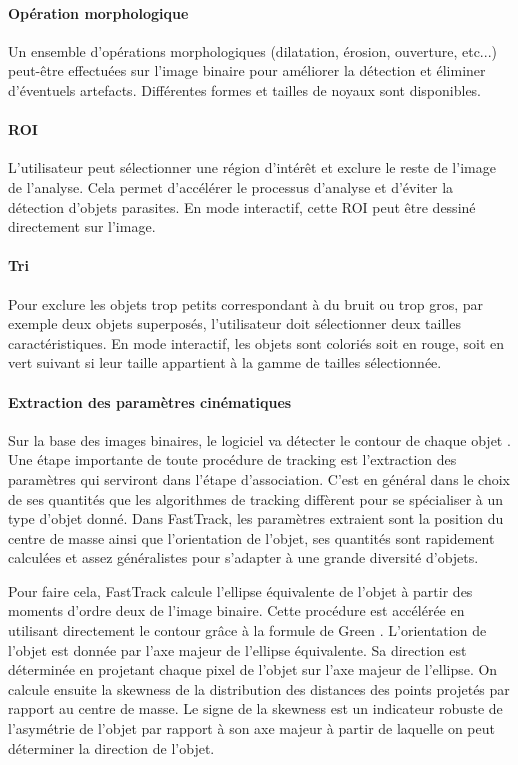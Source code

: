 		
		\paragraph{Opération morphologique}
		Un ensemble d'opérations morphologiques (dilatation, érosion, ouverture, etc...) peut-être effectuées sur l'image binaire pour améliorer la détection et éliminer d'éventuels artefacts. Différentes formes et tailles de noyaux sont disponibles.
		
		
		\paragraph{ROI}
		L'utilisateur peut sélectionner une région d’intérêt et exclure le reste de l'image de l'analyse. Cela permet d'accélérer le processus d'analyse et d'éviter la détection d’objets parasites. En mode interactif, cette ROI peut être dessiné directement sur l'image.
		
		
		\paragraph{Tri}
		Pour exclure les objets trop petits correspondant à du bruit ou trop gros, par exemple deux objets superposés, l’utilisateur doit sélectionner deux tailles caractéristiques. En mode interactif, les objets sont coloriés soit en rouge, soit en vert suivant si leur taille appartient à la gamme de tailles sélectionnée.
		
		\paragraph{Extraction des paramètres cinématiques}
		Sur la base des images binaires, le logiciel va détecter le contour de chaque objet \cite{}. Une étape importante de toute procédure de tracking est l'extraction des paramètres qui serviront dans l'étape d'association. C'est en général dans le choix de ses quantités que les algorithmes de tracking diffèrent pour se spécialiser à un type d'objet donné. Dans FastTrack, les paramètres extraient sont la position du centre de masse ainsi que l'orientation de l’objet, ses quantités sont rapidement calculées et assez généralistes pour s'adapter à une grande diversité d'objets.
\medbreak
		
		Pour faire cela, FastTrack calcule l'ellipse équivalente de l'objet à partir des moments d'ordre deux de l'image binaire. Cette procédure est accélérée en utilisant directement le contour grâce à la formule de Green \cite{}. L'orientation de l'objet est donnée par l'axe majeur de l'ellipse équivalente. Sa direction est déterminée en projetant chaque pixel de l'objet sur l'axe majeur de l'ellipse. On calcule ensuite la skewness de la distribution des distances des points projetés par rapport au centre de masse. Le signe de la skewness est un indicateur robuste de l’asymétrie de l'objet par rapport à son axe majeur à partir de laquelle on peut déterminer la direction de l'objet.
\medbreak
		

